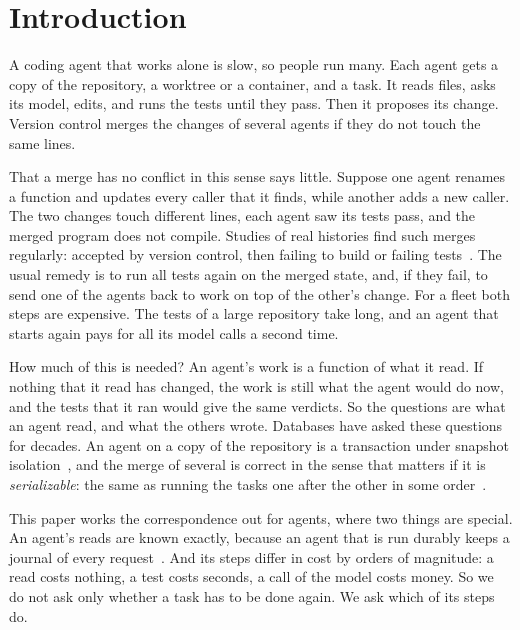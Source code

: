 \documentclass[acmsmall,nonacm,screen]{acmart}
\begin{document}
\authorsaddresses{}

\maketitle

\section{Introduction}

A coding agent that works alone is slow, so people run many. Each agent gets a copy of the
repository, a worktree or a container, and a task. It reads files, asks its model, edits, and
runs the tests until they pass. Then it proposes its change. Version control merges the
changes of several agents if they do not touch the same lines.

That a merge has no conflict in this sense says little. Suppose one agent renames a function
and updates every caller that it finds, while another adds a new caller. The two changes
touch different lines, each agent saw its tests pass, and the merged program does not
compile. Studies of real histories find such merges regularly: accepted by version control,
then failing to build or failing tests~\citep{brun2011}. The usual remedy is to run all tests
again on the merged state, and, if they fail, to send one of the agents back to work on top
of the other's change. For a fleet both steps are expensive. The tests of a large repository
take long, and an agent that starts again pays for all its model calls a second time.

How much of this is needed? An agent's work is a function of what it read. If nothing that
it read has changed, the work is still what the agent would do now, and the tests that it ran
would give the same verdicts. So the questions are what an agent read, and what the others
wrote. Databases have asked these questions for decades. An agent on a copy of the repository
is a transaction under snapshot isolation~\citep{berenson1995}, and the merge of several is
correct in the sense that matters if it is \emph{serializable}: the same as running the tasks
one after the other in some order~\citep{papadimitriou1979}.

This paper works the correspondence out for agents, where two things are special. An agent's
reads are known exactly, because an agent that is run durably keeps a journal of every
request~\citep{tpp8}. And its steps differ in cost by orders of magnitude: a read costs
nothing, a test costs seconds, a call of the model costs money. So we do not ask only whether
a task has to be done again. We ask which of its steps do.
\end{document}
